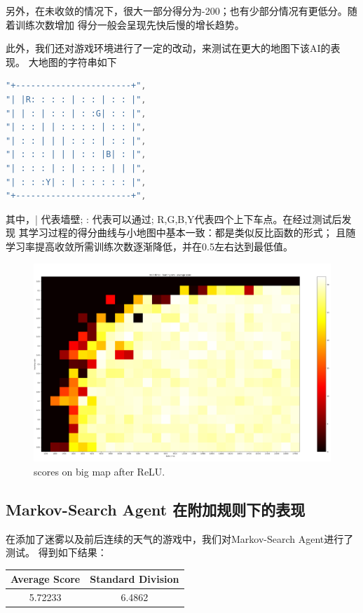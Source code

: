 \documentclass{article}
\begin{document}
\begin{CJK}{UTF8}{gbsn}
另外，在未收敛的情况下，很大一部分得分为-200；也有少部分情况有更低分。随着训练次数增加
得分一般会呈现先快后慢的增长趋势。 

此外，我们还对游戏环境进行了一定的改动，来测试在更大的地图下该AI的表现。
大地图的字符串如下
\begin{lstlisting}[language = C]
"+-----------------------+",
"| |R: : : : | : : | : : |",
"| | : | : : | : :G| : : |",
"| : : | | : : : : | : : |",
"| : : | | | : : : | : : |",
"| : : : | | | : : |B| : |",
"| : : : | : | : : : | | |",
"| : : :Y| : | : : : : : |",
"+-----------------------+",
\end{lstlisting}
其中，| 代表墙壁; : 代表可以通过; R,G,B,Y代表四个上下车点。在经过测试后发现
其学习过程的得分曲线与小地图中基本一致：都是类似反比函数的形式；
且随学习率提高收敛所需训练次数逐渐降低，并在0.5左右达到最低值。
\begin{figure}[htbp]
  \centering
  \includegraphics[scale = 0.1]{images/big_map_relu.png}
  \caption{scores on big map after ReLU.}
\end{figure} 


\subsection{Markov-Search Agent 在附加规则下的表现} 
在添加了迷雾以及前后连续的天气的游戏中，我们对Markov-Search Agent进行了测试。
得到如下结果： 

\begin{table}[htbp]
  \centering
  \begin{tabular}{cc}
    \toprule
    \cmidrule(r){1-2}
    Average Score  & Standard Division \\
    \midrule
    5.72233     & 6.4862  \\
    \bottomrule
  \end{tabular}
\end{table} 


\end{CJK}
\end{document}
